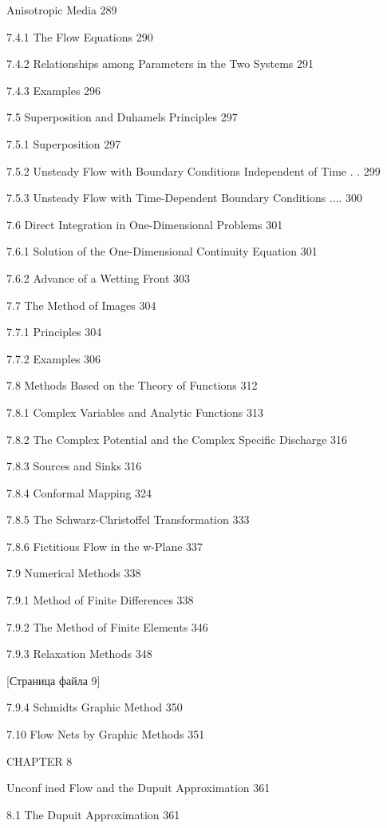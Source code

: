 \documentclass[
  11pt,
]{article}
\begin{document}
Anisotropic Media 289 \par
7.4.1 The Flow Equations 290 \par
7.4.2 Relationships among Parameters in the Two Systems 291 \par
7.4.3 Examples 296 \par
7.5 Superposition and Duhamel\textquotesingle s Principles 297 \par
7.5.1 Superposition 297 \par
7.5.2 Unsteady Flow with Boundary Conditions Independent of Time . . 299 \par
7.5.3 Unsteady Flow with Time-Dependent Boundary Conditions .... 300 \par
7.6 Direct Integration in One-Dimensional Problems 301 \par
7.6.1 Solution of the One-Dimensional Continuity Equation 301 \par
7.6.2 Advance of a Wetting Front 303 \par
7.7 The Method of Images 304 \par
7.7.1 Principles 304 \par
7.7.2 Examples 306 \par
7.8 Methods Based on the Theory of Functions 312 \par
7.8.1 Complex Variables and Analytic Functions 313 \par
7.8.2 The Complex Potential and the Complex Specific Discharge 316 \par
7.8.3 Sources and Sinks 316 \par
7.8.4 Conformal Mapping 324 \par
7.8.5 The Schwarz-Christoffel Transformation 333 \par
7.8.6 Fictitious Flow in the w-Plane 337 \par
7.9 Numerical Methods 338 \par
7.9.1 Method of Finite Differences 338 \par
7.9.2 The Method of Finite Elements 346 \par
7.9.3 Relaxation Methods 348 \par
\smallskip
\smallskip
\smallskip
{[}Страница файла 9{]}\par
7.9.4 Schmidt\textquotesingle s Graphic Method 350 \par
7.10 Flow Nets by Graphic Methods 351 \par
CHAPTER 8 \par
Unconf ined Flow and the Dupuit Approximation 361 \par
8.1 The Dupuit Approximation 361 \par
\end{document}

